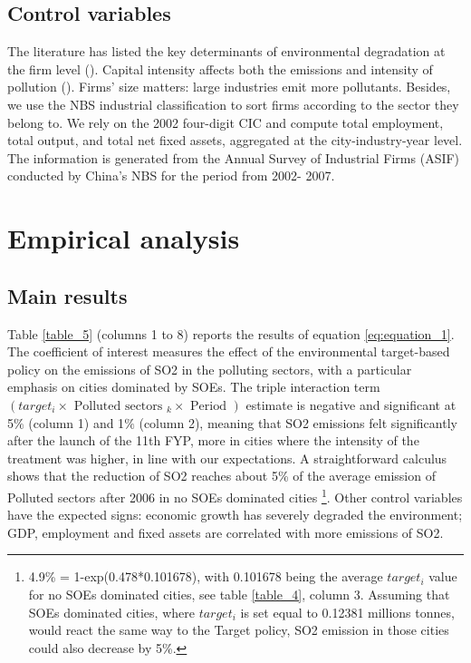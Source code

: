 \documentclass[12pt]{article}
\begin{document}
\subsection{Control variables}

The literature has listed the key determinants of environmental degradation at the firm level (\citealt{Cole2003-ad,Cole2008-pj}). Capital intensity affects both the emissions and intensity of pollution (\citealt{Hering2014-af,Andersen2017-wf}). Firms' size matters: large industries emit more pollutants. Besides, we use the NBS industrial classification to sort firms according to the sector they belong to. We rely on the 2002 four-digit CIC and compute total employment, total output, and total net fixed assets, aggregated at the city-industry-year level. The information is generated from the Annual Survey of Industrial Firms (ASIF) conducted by China's NBS for the period from 2002- 2007. 


\section{Empirical analysis} \label{analysis} 


\subsection{Main results}



Table \ref{table_5} (columns 1 to 8) reports the results of equation \ref{eq:equation_1}. The coefficient of interest measures the effect of the environmental target-based policy on the emissions of SO2 in the polluting sectors, with a particular emphasis on cities dominated by SOEs. The triple interaction term $(target_{i} \times \text { Polluted sectors }_{k} \times \text { Period })$ estimate is negative and significant at 5$\%$  (column 1) and 1$\%$  (column 2), meaning that SO2 emissions felt significantly after the launch of the 11th FYP, more in cities where the intensity of the treatment was higher, in line with our expectations. A straightforward calculus shows that the reduction of SO2 reaches about 5\% of the average emission of Polluted sectors after 2006 in no SOEs dominated cities \footnote{4.9\% = 1-exp(0.478*0.101678), with 0.101678 being the average $target_i$ value for no SOEs dominated cities, see table \ref{table_4}, column 3. Assuming that SOEs dominated cities, where $target_i$ is set equal to 0.12381 millions tonnes, would react the same way to the Target policy, SO2 emission in those cities could also decrease by 5\%.}. Other control variables have the expected signs: economic growth has severely degraded the environment; GDP, employment and fixed assets are correlated with more emissions of SO2. 
\end{document}
